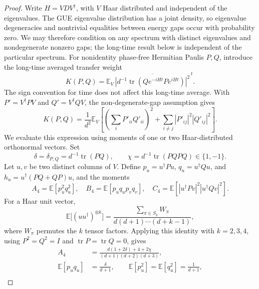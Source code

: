 \documentclass[onecolumn,prx,longbibliography,nofootinbib, superscriptaddress]{revtex4-2}
\theoremstyle{recap}
\begin{document}
\begin{proof}
Write $H=VDV^\dagger$, with $V$ Haar distributed and independent of the eigenvalues. The GUE eigenvalue distribution has a joint density, so eigenvalue degeneracies and nontrivial equalities between energy gaps occur with probability zero. We may therefore condition on any spectrum with distinct eigenvalues and nondegenerate nonzero gaps; the long-time result below is independent of the particular spectrum. For nonidentity phase-free Hermitian Paulis $P,Q$, introduce the long-time averaged transfer weight
\begin{equation}
    K(P,Q)=\mathbb E_V\,\overline{\left|
       d^{-1}\operatorname{tr}\!\left(Qe^{-iHt}Pe^{iHt}\right)
       \right|^2}^{\,t}.
\end{equation}
The sign convention for time does not affect this long-time average. With $P'=V^\dagger PV$ and $Q'=V^\dagger QV$, the non-degenerate-gap assumption gives
\begin{equation}\label{eq:GUE_transfer_time_average}
    K(P,Q)=\frac{1}{d^2}\mathbb E_V\left[
      \left(\sum_i P'_{ii}Q'_{ii}\right)^2
      +\sum_{i\ne j}|P'_{ij}|^2|Q'_{ij}|^2\right].
\end{equation}
We evaluate this expression using moments of one or two Haar-distributed orthonormal vectors. Set
\begin{equation}
    \delta=\delta_{P,Q}=d^{-1}\operatorname{tr}(PQ),\qquad
    \chi=d^{-1}\operatorname{tr}(PQPQ)\in\{1,-1\}.
\end{equation}
Let $u,v$ be two distinct columns of $V$. Define $p_u=u^\dagger Pu$, $q_u=u^\dagger Qu$, and $h_u=u^\dagger(PQ+QP)u$, and the moments
\begin{equation}
    A_4=\mathbb E[p_u^2q_u^2],\quad
    B_4=\mathbb E[p_uq_u p_vq_v],\quad
    C_4=\mathbb E[|u^\dagger Pv|^2|u^\dagger Qv|^2].
\end{equation}
For a Haar unit vector,
\begin{equation}
    \mathbb E\bigl[(uu^\dagger)^{\otimes k}\bigr]
    =\frac{\sum_{\pi\in S_k}W_\pi}{d(d+1)\cdots(d+k-1)},
\end{equation}
where $W_\pi$ permutes the $k$ tensor factors. Applying this identity with $k=2,3,4$, using $P^2=Q^2=I$ and $\operatorname{tr}P=\operatorname{tr}Q=0$, gives
\begin{align}
    A_4&=\frac{d(1+2\delta)+4+2\chi}{(d+1)(d+2)(d+3)},\label{eq:GUE_sphere_fourth}\\
    \mathbb E[p_uq_u]&=\frac{\delta}{d+1},\qquad
    \mathbb E[p_u^2]=\mathbb E[q_u^2]=\frac{1}{d+1},\\

\end{align}
\end{proof}
\end{document}

